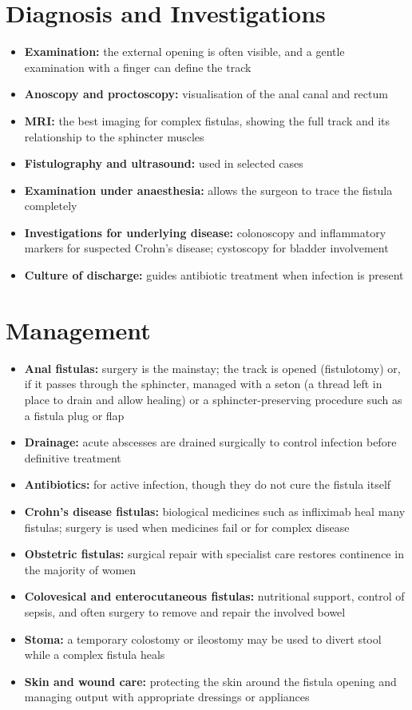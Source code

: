 \section*{Diagnosis and Investigations}
\begin{itemize}
    \item \textbf{Examination:} the external opening is often visible, and a gentle examination with a finger can define the track
    \item \textbf{Anoscopy and proctoscopy:} visualisation of the anal canal and rectum
    \item \textbf{MRI:} the best imaging for complex fistulas, showing the full track and its relationship to the sphincter muscles
    \item \textbf{Fistulography and ultrasound:} used in selected cases
    \item \textbf{Examination under anaesthesia:} allows the surgeon to trace the fistula completely
    \item \textbf{Investigations for underlying disease:} colonoscopy and inflammatory markers for suspected Crohn's disease; cystoscopy for bladder involvement
    \item \textbf{Culture of discharge:} guides antibiotic treatment when infection is present
\end{itemize}

\section*{Management}
\begin{itemize}
    \item \textbf{Anal fistulas:} surgery is the mainstay; the track is opened (fistulotomy) or, if it passes through the sphincter, managed with a seton (a thread left in place to drain and allow healing) or a sphincter-preserving procedure such as a fistula plug or flap
    \item \textbf{Drainage:} acute abscesses are drained surgically to control infection before definitive treatment
    \item \textbf{Antibiotics:} for active infection, though they do not cure the fistula itself
    \item \textbf{Crohn's disease fistulas:} biological medicines such as infliximab heal many fistulas; surgery is used when medicines fail or for complex disease
    \item \textbf{Obstetric fistulas:} surgical repair with specialist care restores continence in the majority of women
    \item \textbf{Colovesical and enterocutaneous fistulas:} nutritional support, control of sepsis, and often surgery to remove and repair the involved bowel
    \item \textbf{Stoma:} a temporary colostomy or ileostomy may be used to divert stool while a complex fistula heals
    \item \textbf{Skin and wound care:} protecting the skin around the fistula opening and managing output with appropriate dressings or appliances
\end{itemize}

